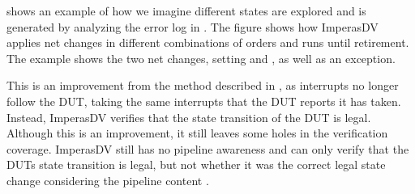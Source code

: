  shows an example of how we imagine different states are explored and is generated by analyzing the error log in \cite{ISSMismatchPending2023}. The figure shows how ImperasDV applies net changes in different combinations of orders and runs until retirement. The example shows the two net changes, setting  and , as well as an exception. 

This is an improvement from the method described in , as interrupts no longer follow the DUT, taking the same interrupts that the DUT reports it has taken. Instead, ImperasDV verifies that the state transition of the DUT is legal. Although this is an improvement, it still leaves some holes in the verification coverage.
ImperasDV still has no pipeline awareness and can only verify that the DUTs state transition is legal, but not whether it was the correct legal state change considering the pipeline content \cite{taylorAdvancedRISCVVerification2023}.




